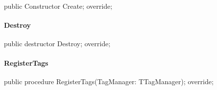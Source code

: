 \documentclass{report}
\newif\ifpdf
\begin{document}
\label{PasDoc_Items.TExternalItem-Create}
\begin{list}{}{
\setlength{\itemindent}{0cm}
\setlength{\listparindent}{0cm}
\setlength{\leftmargin}{\evensidemargin}
\addtolength{\leftmargin}{\tmplength}
\settowidth{\labelsep}{X}
\addtolength{\leftmargin}{\labelsep}
\setlength{\labelwidth}{\tmplength}
}
\item[\textbf{Declaration}\hfill]
\ifpdf
\begin{flushleft}
\fi
\begin{ttfamily}
public Constructor Create; override;\end{ttfamily}

\ifpdf
\end{flushleft}
\fi

\end{list}
\paragraph*{Destroy}\hspace*{\fill}

\label{PasDoc_Items.TExternalItem-Destroy}
\begin{list}{}{
\setlength{\itemindent}{0cm}
\setlength{\listparindent}{0cm}
\setlength{\leftmargin}{\evensidemargin}
\addtolength{\leftmargin}{\tmplength}
\settowidth{\labelsep}{X}
\addtolength{\leftmargin}{\labelsep}
\setlength{\labelwidth}{\tmplength}
}
\item[\textbf{Declaration}\hfill]
\ifpdf
\begin{flushleft}
\fi
\begin{ttfamily}
public destructor Destroy; override;\end{ttfamily}

\ifpdf
\end{flushleft}
\fi

\end{list}
\paragraph*{RegisterTags}\hspace*{\fill}

\label{PasDoc_Items.TExternalItem-RegisterTags}
\begin{list}{}{
\setlength{\itemindent}{0cm}
\setlength{\listparindent}{0cm}
\setlength{\leftmargin}{\evensidemargin}
\addtolength{\leftmargin}{\tmplength}
\settowidth{\labelsep}{X}
\addtolength{\leftmargin}{\labelsep}
\setlength{\labelwidth}{\tmplength}
}
\item[\textbf{Declaration}\hfill]
\ifpdf
\begin{flushleft}
\fi
\begin{ttfamily}
public procedure RegisterTags(TagManager: TTagManager); override;\end{ttfamily}

\ifpdf
\end{flushleft}
\fi

\end{list}
\end{document}
